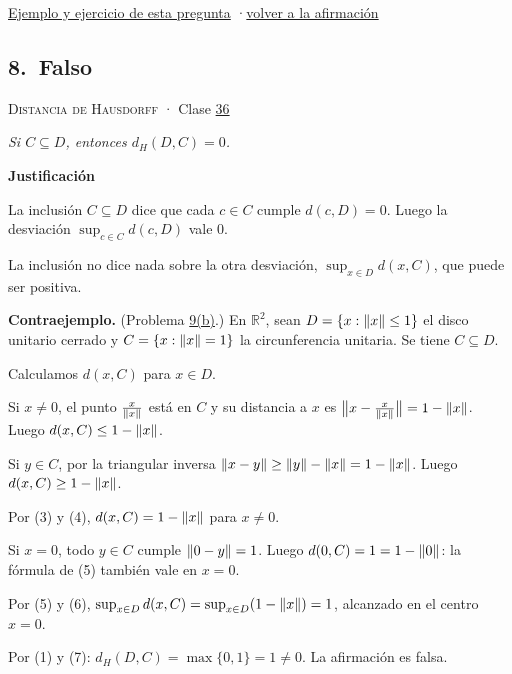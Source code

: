 \documentclass[11pt,a4paper]{article}
\newcommand{\R}{\mathbb{R}}\newcommand{\N}{\mathbb{N}}\newcommand{\Q}{\mathbb{Q}}
\newcommand{\bloque}[1]{\par\smallskip\noindent\textbf{\color{acento}#1}\par}
\begin{document}
\par{}
\par{\small \hyperlink{e-7}{Ejemplo y ejercicio de esta pregunta} \quad·\quad \hyperlink{q-7}{volver a la afirmación}}
\subsection*{\hypertarget{r-8}{}8.\ \textcolor{bad}{Falso}}
{\small \textsc{Distancia de Hausdorff} · Clase \href{https://decostruttivismo.github.io/MAT2514-repaso/pdf/MAT2514_apuntes_completos.pdf\#nameddest=section.36}{36}}\par
\emph{Si $C\subseteq D$, entonces $d_H(D,C)=0$.}
\bloque{Justificación}
\begin{pasos}
\item[(1)] La inclusión $C\subseteq D$ dice que cada $c\in C$ cumple $d(c,D)=0$. Luego la desviación $\sup_{c\in C}d(c,D)$ vale $0$.
\item[(2)] La inclusión no dice nada sobre la otra desviación, $\sup_{x\in D}d(x,C)$, que puede ser positiva.
\item[] \textbf{Contraejemplo.} (Problema \hyperlink{prob-9}{9(b)}.) En $\R^2$, sean $D=\{x:\lVert x\rVert\le1\}$ el disco unitario cerrado y $C=\{x:\lVert x\rVert=1\}$ la circunferencia unitaria. Se tiene $C\subseteq D$.
\item[] Calculamos $d(x,C)$ para $x\in D$.
\item[(3)] Si $x\ne0$, el punto $\frac x{\lVert x\rVert}$ está en $C$ y su distancia a $x$ es $\bigl\lVert x-\frac x{\lVert x\rVert}\bigr\rVert=1-\lVert x\rVert$. Luego $d(x,C)\le1-\lVert x\rVert$.
\item[(4)] Si $y\in C$, por la triangular inversa $\lVert x-y\rVert\ge\lVert y\rVert-\lVert x\rVert=1-\lVert x\rVert$. Luego $d(x,C)\ge1-\lVert x\rVert$.
\item[(5)] Por (3) y (4), $d(x,C)=1-\lVert x\rVert$ para $x\ne0$.
\item[(6)] Si $x=0$, todo $y\in C$ cumple $\lVert 0-y\rVert=1$. Luego $d(0,C)=1=1-\lVert 0\rVert$: la fórmula de (5) también vale en $x=0$.
\item[(7)] Por (5) y (6), $\sup_{x\in D}d(x,C)=\sup_{x\in D}(1-\lVert x\rVert)=1$, alcanzado en el centro $x=0$.
\item[] Por (1) y (7): $d_H(D,C)=\max\{0,1\}=1\ne0$. La afirmación es falsa.
\end{pasos}
\end{document}
